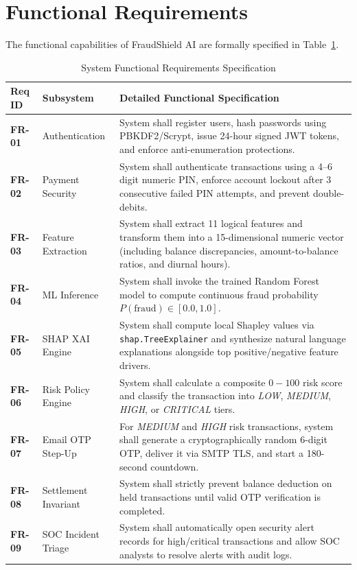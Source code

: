 \section{Functional Requirements}
The functional capabilities of FraudShield AI are formally specified in Table~\ref{tab:functional_requirements}.

\begin{table}[h]
\centering
\caption{System Functional Requirements Specification}
\label{tab:functional_requirements}
\begin{tabularx}{\textwidth}{lp{3.2cm}X}
\toprule
\textbf{Req ID} & \textbf{Subsystem} & \textbf{Detailed Functional Specification} \\
\midrule
\textbf{FR-01} & Authentication & System shall register users, hash passwords using PBKDF2/Scrypt, issue 24-hour signed JWT tokens, and enforce anti-enumeration protections. \\
\addlinespace
\textbf{FR-02} & Payment Security & System shall authenticate transactions using a 4--6 digit numeric PIN, enforce account lockout after 3 consecutive failed PIN attempts, and prevent double-debits. \\
\addlinespace
\textbf{FR-03} & Feature Extraction & System shall extract 11 logical features and transform them into a 15-dimensional numeric vector (including balance discrepancies, amount-to-balance ratios, and diurnal hours). \\
\addlinespace
\textbf{FR-04} & ML Inference & System shall invoke the trained Random Forest model to compute continuous fraud probability $P(\text{fraud}) \in [0.0, 1.0]$. \\
\addlinespace
\textbf{FR-05} & SHAP XAI Engine & System shall compute local Shapley values via \texttt{shap.TreeExplainer} and synthesize natural language explanations alongside top positive/negative feature drivers. \\
\addlinespace
\textbf{FR-06} & Risk Policy Engine & System shall calculate a composite $0-100$ risk score and classify the transaction into \textit{LOW}, \textit{MEDIUM}, \textit{HIGH}, or \textit{CRITICAL} tiers. \\
\addlinespace
\textbf{FR-07} & Email OTP Step-Up & For \textit{MEDIUM} and \textit{HIGH} risk transactions, system shall generate a cryptographically random 6-digit OTP, deliver it via SMTP TLS, and start a 180-second countdown. \\
\addlinespace
\textbf{FR-08} & Settlement Invariant& System shall strictly prevent balance deduction on held transactions until valid OTP verification is completed. \\
\addlinespace
\textbf{FR-09} & SOC Incident Triage & System shall automatically open security alert records for high/critical transactions and allow SOC analysts to resolve alerts with audit logs. \\
\bottomrule
\end{tabularx}
\end{table}


